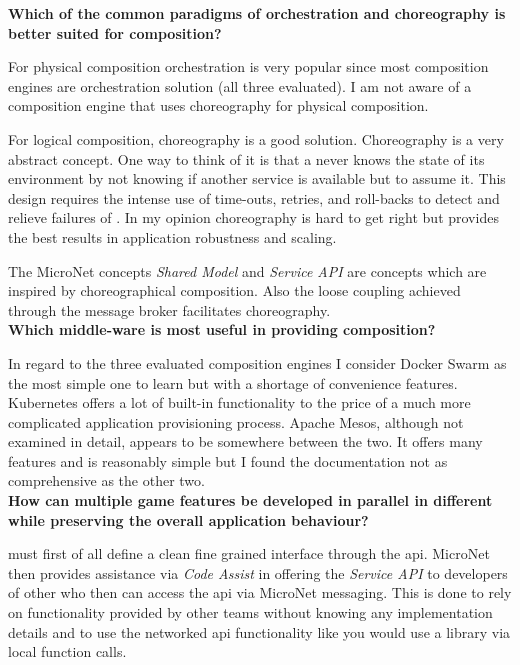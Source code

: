 \noindent
\textbf{Which of the common paradigms of orchestration and choreography is
better suited for \ms{} composition?}

For physical composition orchestration is very popular since most composition
engines are orchestration solution (all three evaluated). I am not aware of a
composition engine that uses choreography for physical composition. 

For logical composition, choreography is a good solution. Choreography is a very
abstract concept. One way to think of it is that a \ms{} never knows the state
of its environment by not knowing if another service is available but to assume
it. This design requires the intense use of time-outs, retries, and roll-backs
to detect and relieve failures of \mss{}. In my opinion choreography is hard to
get right but provides the best results in application robustness and scaling.

The MicroNet concepts \textit{Shared Model} and \textit{Service API} are
concepts which are inspired by choreographical composition. Also the loose
coupling achieved through the message broker facilitates choreography.\\

\noindent
\textbf{Which middle-ware is most useful in providing \ms{} composition?}

In regard to the three evaluated composition engines I consider Docker Swarm as
the most simple one to learn but with a shortage of convenience features.
Kubernetes offers a lot of built-in functionality to the price of a much more
complicated application provisioning process. Apache Mesos, although not
examined in detail, appears to be somewhere between the two. It offers many
features and is reasonably simple but I found the documentation not as
comprehensive as the other two.\\

\noindent
\textbf{How can multiple game features be developed in parallel in different
\mss{} while preserving the overall application behaviour?}

\mssuc{} must first of all define a clean fine grained interface through the
\gls{api}. MicroNet then provides assistance via \textit{Code Assist} in
offering the \textit{Service API} to developers of other \mss{} who then can
access the \gls{api} via MicroNet messaging. This is done to rely on
functionality provided by other \ms{} teams without knowing any implementation
details and to use the networked \gls{api} functionality like you would use a
library via local function calls.

